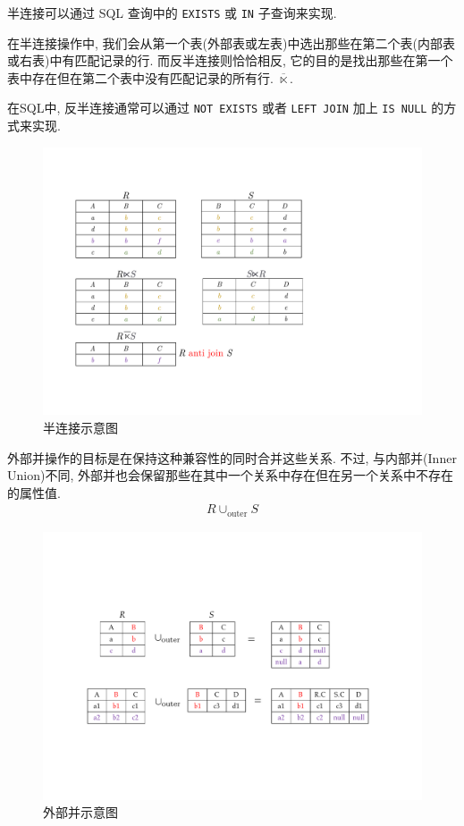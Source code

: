 半连接可以通过 SQL 查询中的 \verb|EXISTS| 或 \verb|IN| 子查询来实现.

\begin{definition}[反半连接]
在半连接操作中, 我们会从第一个表(外部表或左表)中选出那些在第二个表(内部表或右表)中有匹配记录的行. 
而反半连接则恰恰相反, 它的目的是找出那些在第一个表中存在但在第二个表中没有匹配记录的所有行. $\overline{\ltimes}$.
\end{definition}

在SQL中, 反半连接通常可以通过 \verb|NOT EXISTS| 或者 \verb|LEFT JOIN| 加上 \verb|IS NULL| 的方式来实现.

\begin{figure}[H]
    \centering
    \includegraphics[width=.6\textwidth]{./figure/半连接.pdf}
    \caption{半连接示意图}
\end{figure}

\begin{definition}[外部并]
外部并操作的目标是在保持这种兼容性的同时合并这些关系. 
不过, 与内部并(Inner Union)不同, 外部并也会保留那些在其中一个关系中存在但在另一个关系中不存在的属性值.
\begin{align*}
    R \cup_{\text{outer}} S
\end{align*}
\end{definition}

\begin{figure}[H]
    \centering
    \includegraphics[width=.8\textwidth]{./figure/外部并.pdf}
    \caption{外部并示意图}
\end{figure}

